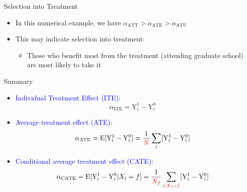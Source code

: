 \documentclass[hyperref={pdfpagelabels=false}]{beamer}
\begin{document}
\begin{frame}{Selection into Treatment}
	\begin{itemize}	
		
		\item In this numerical example, we have $\alpha_{\text{ATT}} > \alpha_{\text{ATE}} > \alpha_{\text{ATU}}$
				\vspace{0.2cm}
		\item This may indicate selection into treatment:
				\vspace{0.2cm}
	\begin{itemize}	
		\item Those who benefit most from the treatment (attending graduate school) are most likely to take it 
			\end{itemize}
	\end{itemize}
	
\end{frame}




\begin{frame}{Summary}
	\begin{itemize}	
		
		\item \textcolor{blue} {Individual Treatment Effect (ITE)}:
		\begin{equation*}
				\alpha_{\text{ITE}} = \mathrm{Y}^{1}_{i} - \mathrm{Y}^{0}_{i}
		\end{equation*}	
		
		
		\item \textcolor{blue} {Average treatment effect (ATE)}:
		\begin{equation*}
			\alpha_{\text{ATE}} =  \mathrm{E}[\mathrm{Y}^{1}_{i}-\mathrm{Y}^{0}_{i}] = \dfrac{1}{\color{red}N} \sum_{i}[\mathrm{Y}^{1}_{i}-\mathrm{Y}^{0}_{i}]
		\end{equation*}
		
		
		\item \textcolor{blue} {Conditional average treatment effect (CATE)}:
		\begin{equation*}
			\alpha_{\text{CATE}} =  \mathrm{E}[\mathrm{Y}^{1}_{i}-\mathrm{Y}^{0}_{i}|X_i=f] = \dfrac{1}{\color{red}N_f} \sum_{\color{red}i:X_i=f}[\mathrm{Y}^{1}_{i}-\mathrm{Y}^{0}_{i}]
		\end{equation*}
		
	\end{itemize}
	
\end{frame}
\end{document}
